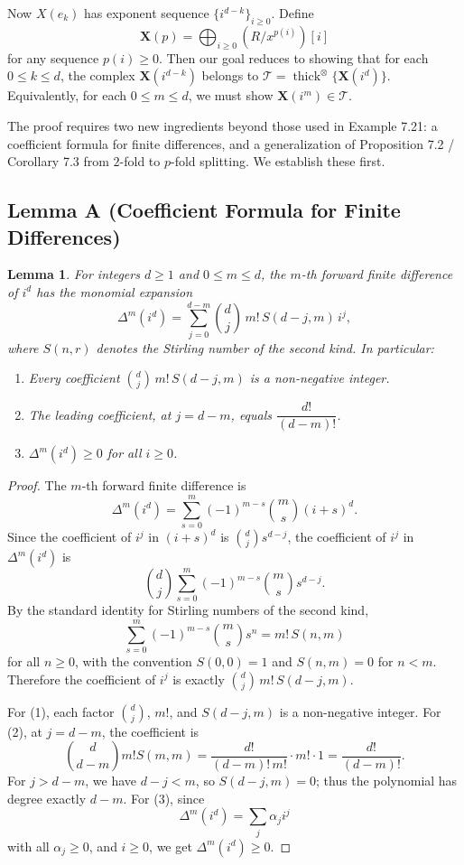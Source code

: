 \documentclass[11pt]{article}
\newtheorem{lemma}{Lemma}
\newcommand{\XX}{\mathbf{X}}
\newcommand{\TT}{\mathcal{T}}
\newcommand{\thicktensor}[1]{\operatorname{thick}^{\otimes}\{#1\}}
\begin{document}
Now $X(e_k)$ has exponent sequence $\{i^{d-k}\}_{i \geqslant 0}$. Define
\[
\XX(p)=\bigoplus_{i \geqslant 0}(R/x^{p(i)})[i]
\]
for any sequence $p(i) \geqslant 0$. Then our goal reduces to showing that for each $0 \leqslant k \leqslant d$, the complex $\XX(i^{d-k})$ belongs to $\TT=\thicktensor{\XX(i^d)}$. Equivalently, for each $0 \leqslant m \leqslant d$, we must show $\XX(i^m)\in\TT$.

The proof requires two new ingredients beyond those used in Example 7.21: a coefficient formula for finite differences, and a generalization of Proposition 7.2 / Corollary 7.3 from $2$-fold to $p$-fold splitting. We establish these first.

\subsection*{Lemma A (Coefficient Formula for Finite Differences)}

\begin{lemma}
For integers $d \geqslant 1$ and $0 \leqslant m \leqslant d$, the $m$-th forward finite difference of $i^d$ has the monomial expansion
\[
\Delta^m(i^d)
=
\sum_{j=0}^{d-m} \binom{d}{j}\, m!\, S(d-j,m)\, i^j,
\]
where $S(n,r)$ denotes the Stirling number of the second kind. In particular:
\begin{enumerate}
\item Every coefficient $\binom{d}{j}\, m!\, S(d-j,m)$ is a non-negative integer.
\item The leading coefficient, at $j=d-m$, equals $\dfrac{d!}{(d-m)!}$.
\item $\Delta^m(i^d)\geqslant 0$ for all $i \geqslant 0$.
\end{enumerate}
\end{lemma}

\begin{proof}
The $m$-th forward finite difference is
\[
\Delta^m(i^d)=\sum_{s=0}^{m}(-1)^{m-s}\binom{m}{s}(i+s)^d.
\]
Since the coefficient of $i^j$ in $(i+s)^d$ is $\binom{d}{j}s^{d-j}$, the coefficient of $i^j$ in $\Delta^m(i^d)$ is
\[
\binom{d}{j}\sum_{s=0}^{m}(-1)^{m-s}\binom{m}{s}s^{d-j}.
\]
By the standard identity for Stirling numbers of the second kind,
\[
\sum_{s=0}^{m}(-1)^{m-s}\binom{m}{s}s^n=m!\,S(n,m)
\]
for all $n \geqslant 0$, with the convention $S(0,0)=1$ and $S(n,m)=0$ for $n<m$. Therefore the coefficient of $i^j$ is exactly $\binom{d}{j}\,m!\,S(d-j,m)$.

For (1), each factor $\binom{d}{j}$, $m!$, and $S(d-j,m)$ is a non-negative integer. For (2), at $j=d-m$, the coefficient is
\[
\binom{d}{d-m}m!S(m,m)
=
\frac{d!}{(d-m)!\,m!}\cdot m!\cdot 1
=
\frac{d!}{(d-m)!}.
\]
For $j>d-m$, we have $d-j<m$, so $S(d-j,m)=0$; thus the polynomial has degree exactly $d-m$. For (3), since
\[
\Delta^m(i^d)=\sum_j \alpha_j i^j
\]
with all $\alpha_j \geqslant 0$, and $i \geqslant 0$, we get $\Delta^m(i^d)\geqslant 0$.
\end{proof}
\end{document}

